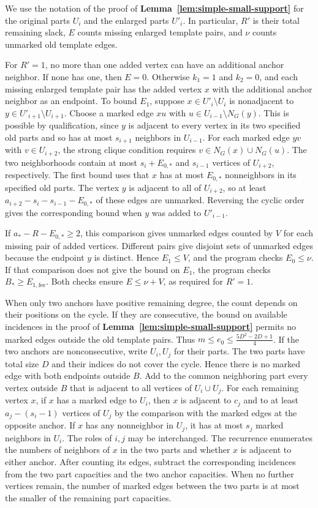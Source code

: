 \documentclass[preprint,11pt,numbers]{elsarticle-arxiv}
\numberwithin{equation}{section}
\theoremstyle{definition}
\begin{document}
We use the notation of the proof of \textbf{Lemma~\ref{lem:simple-small-support}}
for the original parts $U_i$ and the enlarged parts $U'_i$. In particular,
$R'$ is their total remaining slack, $E$ counts missing enlarged template
pairs, and $\nu$ counts unmarked old template edges.

For $R'=1$, no more than one added vertex can have an additional
anchor neighbor. If none has one, then $E=0$. Otherwise
$k_1=1$ and $k_2=0$, and each missing enlarged template pair
has the added vertex $x$ with the additional anchor neighbor
as an endpoint. To bound $E_1$, suppose
$x\in U'_i\setminus U_i$ is nonadjacent to
$y\in U'_{i+1}\setminus U_{i+1}$. Choose a marked edge $xu$
with $u\in U_{i-1}\setminus N_G(y)$. This is possible
by qualification, since $y$ is adjacent to every vertex in its two
specified old parts and so has at most $s_{i+1}$ neighbors in
$U_{i-1}$. For each marked edge $yv$ with $v\in U_{i+2}$,
the strong clique condition requires $v\in N_G(x)\cup N_G(u)$.
The two neighborhoods contain at most $s_i+E_{0,*}$ and
$s_{i-1}$ vertices of $U_{i+2}$, respectively. The first bound
uses that $x$ has at most $E_{0,*}$ nonneighbors in its
specified old parts. The vertex $y$ is adjacent to all of
$U_{i+2}$, so at least $a_{i+2}-s_i-s_{i-1}-E_{0,*}$ of
these edges are unmarked. Reversing the cyclic order gives
the corresponding bound when $y$ was added to $U'_{i-1}$.

If $a_*-R-E_{0,*}\geq2$, this comparison gives unmarked edges
counted by $V$ for each missing pair of added vertices. Different
pairs give disjoint sets of unmarked edges because the endpoint
$y$ is distinct. Hence $E_1\leq V$, and the program checks
$E_0\leq\nu$. If that comparison does not give the bound on
$E_1$, the program checks $B_*\geq E_{1,\mathrm{fee}}$. Both
checks ensure $E\leq\nu+V$, as required for $R'=1$.

When only two anchors have positive remaining degree, the count
depends on their positions on the cycle. If they are consecutive,
the bound on available incidences in the proof of
\textbf{Lemma~\ref{lem:simple-small-support}} permits no marked
edges outside the old template pairs. Thus
$m\leq e_0\leq\frac{5D^2-2D+1}{4}$. If the two anchors are
nonconsecutive, write $U_i,U_j$ for their parts. The two parts
have total size $D$ and their indices do not cover the cycle.
Hence there is no marked edge with both endpoints outside $B$.
Add to the common neighboring part every vertex outside $B$
that is adjacent to all vertices of $U_i\cup U_j$. For each
remaining vertex $x$, if $x$ has a marked edge to $U_i$, then
$x$ is adjacent to $c_j$ and to at least $a_j-(s_i-1)$ vertices
of $U_j$ by the comparison with the marked edges at the opposite
anchor. If $x$ has any nonneighbor in $U_j$, it has at most
$s_j$ marked neighbors in $U_i$. The roles of $i,j$ may be
interchanged. The recurrence enumerates the numbers of neighbors
of $x$ in the two parts and whether $x$ is adjacent to either
anchor. After counting its edges, subtract the corresponding
incidences from the two part capacities and the two anchor
capacities. When no further vertices remain, the number of
marked edges between the two parts is at most the smaller of the
remaining part capacities.
\end{document}
